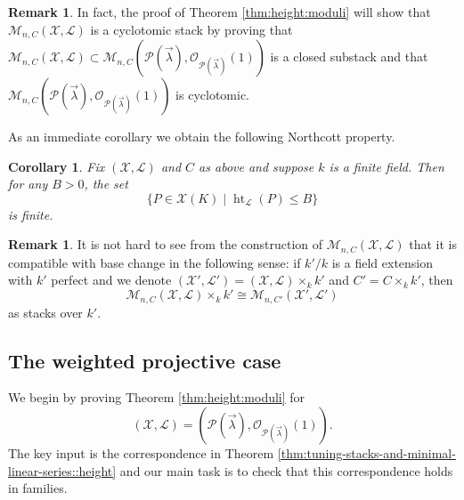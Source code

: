 \documentclass[a4paper,12pt]{amsart}
\newtheorem{cor}[thm]{Corollary}
\theoremstyle{definition}
\newtheorem{rmk}[thm]{Remark}
\newcommand{\cX}{\mathcal{X}}
\newcommand{\cO}{\mathcal{O}}
\newcommand{\cL}{\mathcal{L}}
\newcommand{\cM}{\mathcal{M}}
\DeclareMathOperator{\height}{ht}
\newcommand{\Pcv}{\mathcal{P}(\vec{\lambda})}
\begin{document}
	\begin{rmk}\label{rmk:Mnccyclotomic}
		In fact, the proof of Theorem \ref{thm:height:moduli} will show that $\cM_{n,C}(\cX, \cL)$ is a cyclotomic stack by proving that $\cM_{n,C}(\cX, \cL)\subset\cM_{n,C}(\Pcv,\cO_{\Pcv}(1))$ is a closed substack and that $\cM_{n,C}(\Pcv,\cO_{\Pcv}(1))$ is cyclotomic.
	\end{rmk}
	
	As an immediate corollary we obtain the following Northcott property. 
	
	\begin{cor}\label{cor:northcott} Fix $(\cX, \cL)$ and $C$ as above and suppose $k$ is a finite field. Then for any $B > 0$, the set
		$$
		\{ P \in \cX(K) \mid \height_{\cL}(P) \le B \}
		$$
		is finite. 
	\end{cor}
	
	\begin{rmk} It is not hard to see from the construction of $\cM_{n,C}(\cX, \cL)$ that it is compatible with base change in the following sense: if $k'/k$ is a field extension with $k'$ perfect and we denote $(\cX', \cL') = (\cX, \cL) \times_k k'$ and $C' = C \times_k k'$, then 
		$$
		\cM_{n,C}(\cX, \cL) \times_k k' \cong \cM_{n,C'}(\cX', \cL')
		$$
		as stacks over $k'$. 
		
	\end{rmk}
	
	\subsection{The weighted projective case}\label{subsec:modwps}
	
	We begin by proving Theorem \ref{thm:height:moduli} for 
	$$
	(\cX, \cL) = \left(\Pcv, \cO_{\Pcv}(1)\right).
	$$ 
	The key input is the correspondence in Theorem \ref{thm:tuning-stacks-and-minimal-linear-series::height} and our main task is to check that this correspondence holds in families. 
	
\end{document}

